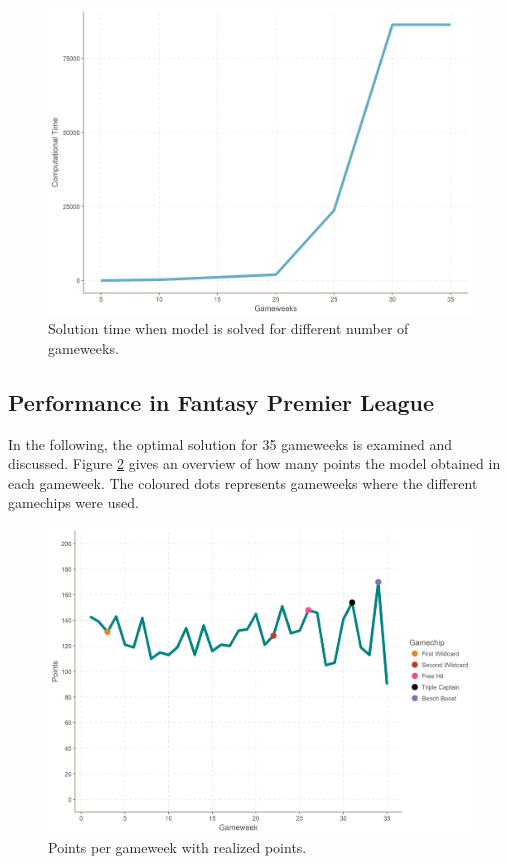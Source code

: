 \begin{figure}[H]
    \centering
    \includegraphics[scale=0.3]{fig/chapter_7/comp_time.png}
    \caption{Solution time when model is solved for different number of gameweeks.}
    \label{fig:comp_time_diff_gameweeks}   
\end{figure}

\subsection{Performance in Fantasy Premier League}

In the following, the optimal solution for 35 gameweeks is examined and discussed. Figure \ref{Figure_Realized_points} gives an overview of how many points the model obtained in each gameweek. The coloured dots represents gameweeks where the different gamechips were used. 

\begin{figure}[H]
    \centering
    \includegraphics[scale=0.5]{fig/chapter_7/perf_gc.png}
    \caption{Points per gameweek with realized points.}
\label{Figure_Realized_points}    
\end{figure}

